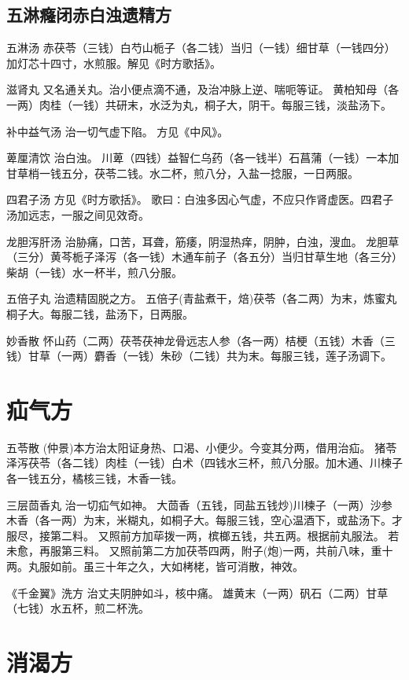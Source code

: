 \documentclass[a4paper,12pt,UTF8,twoside]{ctexbook}
\begin{document}
	\section{五淋癃闭赤白浊遗精方}
	五淋汤
	赤茯苓（三钱）白芍山栀子（各二钱）当归（一钱）细甘草（一钱四分）加灯芯十四寸，水煎服。解见《时方歌括》。
	
	滋肾丸
	又名通关丸。治小便点滴不通，及治冲脉上逆、喘呃等证。
	黄柏知母（各一两）肉桂（一钱）共研末，水泛为丸，桐子大，阴干。每服三钱，淡盐汤下。
	
	补中益气汤
	治一切气虚下陷。
	方见《中风》。
	
	萆厘清饮
	治白浊。
	川萆（四钱）益智仁乌药（各一钱半）石菖蒲（一钱）一本加甘草梢一钱五分，茯苓二钱。水二杯，煎八分，入盐一捻服，一日两服。
	
	四君子汤
	方见《时方歌括》。
	歌曰∶白浊多因心气虚，不应只作肾虚医。四君子汤加远志，一服之间见效奇。
	
	龙胆泻肝汤
	治胁痛，口苦，耳聋，筋痿，阴湿热痒，阴肿，白浊，溲血。
	龙胆草（三分）黄芩栀子泽泻（各一钱）木通车前子（各五分）当归甘草生地（各三分）柴胡（一钱）水一杯半，煎八分服。
	
	五倍子丸
	治遗精固脱之方。
	五倍子(青盐煮干，焙)茯苓（各二两）为末，炼蜜丸桐子大。每服二钱，盐汤下，日两服。
	
	妙香散
	怀山药（二两）茯苓茯神龙骨远志人参（各一两）桔梗（五钱）木香（三钱）甘草（一两）麝香（一钱）朱砂（二钱）共为末。每服三钱，莲子汤调下。
	
	
	
	\chapter{疝气方}	
	
	五苓散
	(仲景)本方治太阳证身热、口渴、小便少。今变其分两，借用治疝。
	猪苓泽泻茯苓（各二钱）肉桂（一钱）白术（四钱水三杯，煎八分服。加木通、川楝子各一钱五分，橘核三钱，木香一钱。
	
	三层茴香丸
	治一切疝气如神。
	大茴香（五钱，同盐五钱炒)川楝子（一两）沙参木香（各一两）为末，米糊丸，如桐子大。每服三钱，空心温酒下，或盐汤下。才服尽，接第二料。
	又照前方加荜拨一两，槟榔五钱，共五两。根据前丸服法。
	若未愈，再服第三料。
	又照前第二方加茯苓四两，附子(炮)一两，共前八味，重十两。丸服如前。虽三十年之久，大如栲栳，皆可消散，神效。
	
	《千金翼》洗方
	治丈夫阴肿如斗，核中痛。
	雄黄末（一两）矾石（二两）甘草（七钱）水五杯，煎二杯洗。
	
	

	\chapter{消渴方}
		
\end{document}
